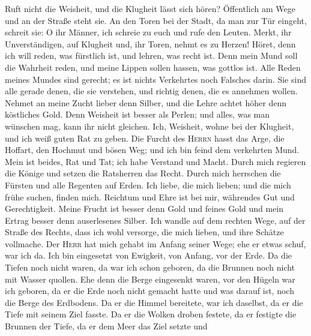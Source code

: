  Ruft nicht die Weisheit, und die Klugheit lässt sich
hören?  Öffentlich am Wege und an der Straße steht sie.
 An den Toren bei der Stadt, da man zur Tür eingeht,
schreit sie:  O ihr Männer, ich schreie zu euch und rufe
den Leuten.  Merkt, ihr Unverständigen, auf Klugheit und,
ihr Toren, nehmt es zu Herzen!  Höret, denn ich will
reden, was fürstlich ist, und lehren, was recht ist.  Denn
mein Mund soll die Wahrheit reden, und meine Lippen sollen hassen, was
gottlos ist.  Alle Reden meines Mundes sind gerecht; es
ist nichts Verkehrtes noch Falsches darin.  Sie sind alle
gerade denen, die sie verstehen, und richtig denen, die es annehmen
wollen.  Nehmet an meine Zucht lieber denn Silber, und
die Lehre achtet höher denn köstliches Gold.  Denn
Weisheit ist besser als Perlen; und alles, was man wünschen mag, kann
ihr nicht gleichen.  Ich, Weisheit, wohne bei der
Klugheit, und ich weiß guten Rat zu geben.  Die Furcht
des \textsc{Herrn} hasst das Arge, die Hoffart, den Hochmut und bösen
Weg; und ich bin feind dem verkehrten Mund.  Mein ist
beides, Rat und Tat; ich habe Verstand und Macht.  Durch
mich regieren die Könige und setzen die Ratsherren das Recht.
 Durch mich herrschen die Fürsten und alle Regenten auf
Erden.  Ich liebe, die mich lieben; und die mich frühe
suchen, finden mich.  Reichtum und Ehre ist bei mir,
währendes Gut und Gerechtigkeit.  Meine Frucht ist besser
denn Gold und feines Gold und mein Ertrag besser denn auserlesenes
Silber.  Ich wandle auf dem rechten Wege, auf der Straße
des Rechts,  dass ich wohl versorge, die mich lieben, und
ihre Schätze vollmache.  Der \textsc{Herr} hat mich
gehabt im Anfang seiner Wege; ehe er etwas schuf, war ich da.
 Ich bin eingesetzt von Ewigkeit, von Anfang, vor der
Erde.  Da die Tiefen noch nicht waren, da war ich schon
geboren, da die Brunnen noch nicht mit Wasser quollen. 
Ehe denn die Berge eingesenkt waren, vor den Hügeln war ich geboren,
 da er die Erde noch nicht gemacht hatte und was darauf
ist, noch die Berge des Erdbodens.  Da er die Himmel
bereitete, war ich daselbst, da er die Tiefe mit seinem Ziel fasste.
 Da er die Wolken droben festete, da er festigte die
Brunnen der Tiefe,  da er dem Meer das Ziel setzte und

